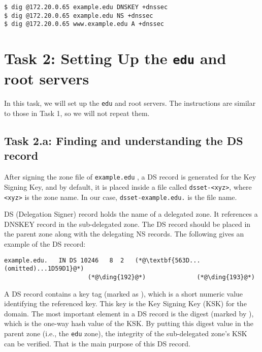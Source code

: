 \begin{lstlisting}
$ dig @172.20.0.65 example.edu DNSKEY +dnssec
$ dig @172.20.0.65 example.edu NS +dnssec
$ dig @172.20.0.65 www.example.edu A +dnssec
\end{lstlisting}
 




\section{Task 2: Setting Up the \texttt{edu} and root servers}


In this task, we will set up the \texttt{edu} and root servers. 
The instructions are similar to those in Task 1, so we will not repeat them. 


\subsection{Task 2.a: Finding and understanding the DS record}


After signing the zone file of \texttt{example.edu} , a DS record is generated for the Key
Signing Key, and by default, it is placed inside a file called \texttt{dsset-<xyz>}, where
\texttt{<xyz>} is the zone name. In our case, \texttt{dsset-example.edu.} is the file name.


DS (Delegation Signer) record holds the name of a delegated zone. It 
references a DNSKEY record in the sub-delegated zone. 
The DS record should be placed in the parent zone along with the delegating NS records.
The following gives an example of the DS record:


\begin{lstlisting}
example.edu.   IN DS 10246   8  2   (*@\textbf{563D...(omitted)...1D59D1}@*)
                       (*@\ding{192}@*)              (*@\ding{193}@*)
\end{lstlisting}

A DS record contains a key tag (marked as ), which is a 
short numeric value identifying the referenced key. This key
is the Key Signing Key (KSK) for the domain.
The most important element in a DS record is the digest (marked by ),
which is the one-way hash value of the KSK. By putting this digest
value in the parent zone (i.e., the \texttt{edu} zone), 
the integrity of the sub-delegated zone's
KSK can be verified. That is the main purpose of this DS record. 



